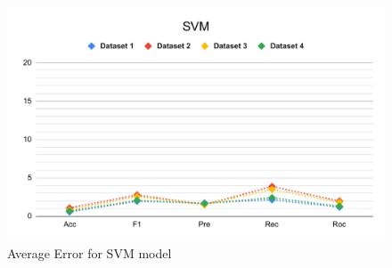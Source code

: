\begin{figure}[!tb]
    \centering
    \includegraphics[width=0.9\columnwidth]{media/results/delta_SVM.pdf}
    \caption{Average Error for SVM model} \label{fig:perfromance_delta_svm}
\end{figure}
